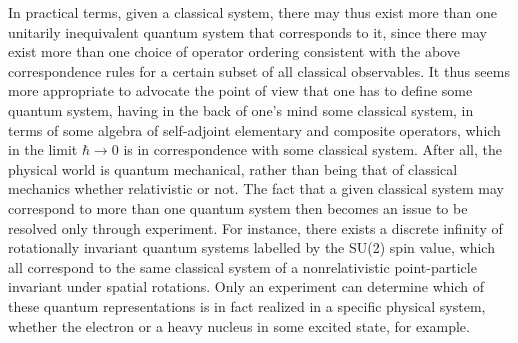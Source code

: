 \documentclass[a4paper,11pt]{article}
\begin{document}
In practical terms, given a classical 
system, there may thus exist more than one unitarily inequivalent quantum 
system that corresponds to it, since there may exist more than one choice
of operator ordering consistent with the above correspondence rules
for a certain subset of all classical observables\cite{Klaud2}. 
It thus seems more
appropriate to advocate the point of view that one has to define some
quantum system, having in the back of one's mind some classical system,
in terms of some algebra of self-adjoint elementary and composite
operators, which in the limit $\hbar\rightarrow 0$ is in correspondence
with some classical system. After all, the physical world is quantum 
mechanical, rather than being that of classical mechanics whether 
relativistic or not.
The fact that a given classical system may correspond to more than one 
quantum system then becomes an issue to be resolved only through experiment. 
For instance, there exists a discrete infinity of rotationally invariant 
quantum systems labelled by the SU(2) spin value, which all correspond to 
the same classical system of a nonrelativistic point-particle invariant 
under spatial rotations. Only an experiment can determine which of these
quantum representations is in fact realized in a specific physical system, 
whether the electron or a heavy nucleus in some excited state, for example.
\end{document}
